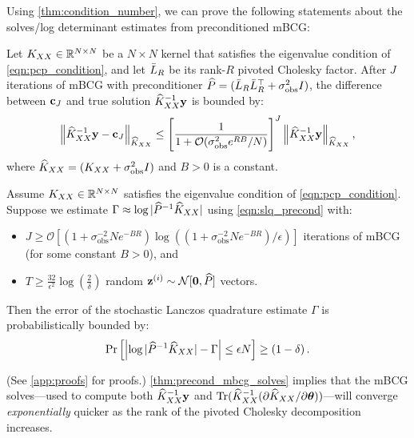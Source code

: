 Using \cref{thm:condition_number}, we can prove the following statements about the solves/log determinant estimates from preconditioned mBCG:
%
\begin{theorem}
  \label{thm:precond_mbcg_solves}
  Let $K_{XX} \in \mathbb{R}^{N \times N}$ be a $N \times N$ kernel that satisfies the eigenvalue condition of \cref{eqn:pcp_condition},
	and let $\bar{L}_R$ be its rank-$R$ pivoted Cholesky factor.
	After $J$ iterations of mBCG with preconditioner $\widehat{P} = (\bar{L}_R \bar{L}_R^\top + \sigma_\text{obs}^2 I)$,
	the difference between $\mathbf{c}_J$ and true solution $\widehat{K}_{XX}^{-1} \mathbf{y}$ is bounded by:
  \begin{equation*}
    \left \Vert \trainK^{-1} \by - \bc_{J} \right \Vert_{\trainK}
    \leq \Bigg[ \frac 1 {1 + \bigo{\sigma^{2}_\text{obs} e^{RB}/N}} \Bigg]^{J}
    \left \Vert \trainK^{-1} \by \right \Vert_{\trainK},
		\nonumber
  \end{equation*}
	where $\widehat{K}_{XX} = (K_{XX} + \sigma^2_\text{obs} I)$ and $B > 0$ is a constant.
\end{theorem}
%
\begin{theorem}
  \label{thm:precond_mbcg_logdet}
  Assume $K_{XX} \in \mathbb{R}^{N \times N}$ satisfies the eigenvalue condition of \cref{eqn:pcp_condition}.
	Suppose we estimate $\Gamma \approx \log \vert \widehat{P}^{-1} \widehat{K}_{XX} \vert$ using \cref{eqn:slq_precond} with:
	\begin{itemize}
		\item $J \geq \mathcal{O} \left[ (1 + \sigma^{-2}_\text{obs} N e^{-BR}) \log \left( ( 1 + \sigma^{-2}_\text{obs} N e^{-BR} ) / \epsilon \right) \right]$ iterations of mBCG (for some constant $B > 0$), and
		\item $T \geq \frac{32}{\epsilon^2} \log \left( \frac 2 \delta \right)$ random $\bz^{(i)} \sim \normaldist{\bzero}{\trainP}$ vectors.
	\end{itemize}
  Then the error of the stochastic Lanczos quadrature estimate $\Gamma$ is probabilistically bounded by:
  \begin{equation*}
    \textrm{Pr}\left[\Bigl\vert \log \vert \widehat{P}^{-1} \widehat{K}_{XX} \vert - \Gamma \Bigr\vert \leq \epsilon N \right] \geq \left( 1 - \delta \right).
  \end{equation*}
\end{theorem}
%
\noindent
(See \cref{app:proofs} for proofs.)
\cref{thm:precond_mbcg_solves} implies that the mBCG solves---used to compute both $\widehat{K}_{XX}^{-1} \mathbf{y}$ and $\tr{ \trainK^{-1} (\partial \trainK / \partial \btheta)}$---will converge \emph{exponentially} quicker as the rank of the pivoted Cholesky decomposition increases.

